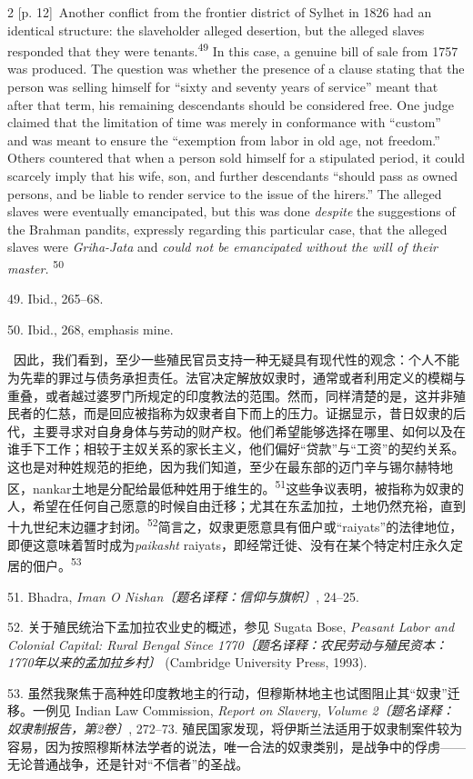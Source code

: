 \documentclass[10pt,a4paper]{article}
\begin{document}
\begin{paracol}{2}
{\scriptsize\color{gray} [p. 12]}\ Another conflict from the frontier district of Sylhet in 1826 had an identical structure: the slaveholder alleged desertion, but the alleged slaves responded that they were tenants.\nobreak\textsuperscript{49} In this case, a genuine bill of sale from 1757 was produced. The question was whether the presence of a clause stating that the person was selling himself for “sixty and seventy years of service” meant that after that term, his remaining descendants should be considered free. One judge claimed that the limitation of time was merely in conformance with “custom” and was meant to ensure the “exemption from labor in old age, not freedom.” Others countered that when a person sold himself for a stipulated period, it could scarcely imply that his wife, son, and further descendants “should pass as owned persons, and be liable to render service to the issue of the hirers.” The alleged slaves were eventually emancipated, but this was done \textit{despite} the suggestions of the Brahman pandits, expressly regarding this particular case, that the alleged slaves were \textit{Griha-Jata} and \textit{could not be emancipated without the will of their master.} \nobreak\textsuperscript{50}\par{\small 49. Ibid., 265–68.\par}{\small 50. Ibid., 268, emphasis mine.\par}
\switchcolumn*
{\scriptsize\color{gray} [p. 13]}\ 因此，我们看到，至少一些殖民官员支持一种无疑具有现代性的观念：个人不能为先辈的罪过与债务承担责任。法官决定解放奴隶时，通常或者利用定义的模糊与重叠，或者越过婆罗门所规定的印度教法的范围。然而，同样清楚的是，这并非殖民者的仁慈，而是回应被指称为奴隶者自下而上的压力。证据显示，昔日奴隶的后代，主要寻求对自身身体与劳动的财产权。他们希望能够选择在哪里、如何以及在谁手下工作；相较于主奴关系的家长主义，他们偏好“贷款”与“工资”的契约关系。这也是对种姓规范的拒绝，因为我们知道，至少在最东部的迈门辛与锡尔赫特地区，nankar土地是分配给最低种姓用于维生\mbox{的。\textsuperscript{51}}这些争议表明，被指称为奴隶的人，希望在任何自己愿意的时候自由迁移；尤其在东孟加拉，土地仍然充裕，直到十九世纪末边疆才封\mbox{闭。\textsuperscript{52}}简言之，奴隶更愿意具有佃户或“raiyats”的法律地位，即便这意味着暂时成为\textit{paikasht} raiyats，即经常迁徙、没有在某个特定村庄永久定居的佃\mbox{户。\textsuperscript{53}}\par{\small 51. Bhadra, \textit{Iman O Nishan〔题名译释：信仰与旗帜〕}, 24–25.\par}{\small 52. 关于殖民统治下孟加拉农业史的概述，参见 Sugata Bose, \textit{Peasant Labor and Colonial Capital: Rural Bengal Since 1770〔题名译释：农民劳动与殖民资本：1770年以来的孟加拉乡村〕} (Cambridge University Press, 1993).\par}{\small 53. 虽然我聚焦于高种姓印度教地主的行动，但穆斯林地主也试图阻止其“奴隶”迁移。一例见 Indian Law Commission, \textit{Report on Slavery, Volume 2〔题名译释：奴隶制报告，第2卷〕}, 272–73. 殖民国家发现，将伊斯兰法适用于奴隶制案件较为容易，因为按照穆斯林法学者的说法，唯一合法的奴隶类别，是战争中的俘虏——无论普通战争，还是针对“不信者”的圣战。\par}

\end{paracol}
\end{document}
